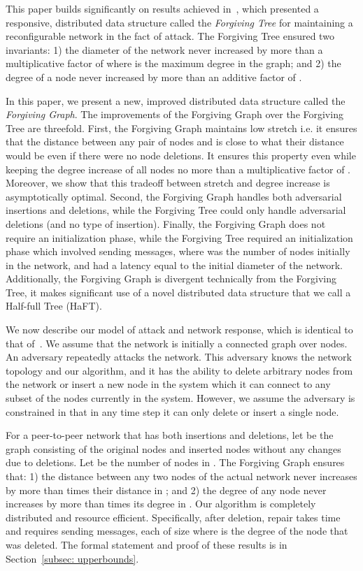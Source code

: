 \documentclass[11pt, letter]{article}
\begin{document}
This paper builds significantly on results achieved in~\cite{HayesPODC08}, which presented a responsive, distributed data structure called the \emph{Forgiving Tree} for maintaining a reconfigurable network in the fact of attack. The Forgiving Tree ensured two invariants: 1) the diameter of the network never increased by more than a multiplicative factor of  where  is the maximum degree in the graph; and 2) the degree of a node never increased by more than an additive factor of .  

In this paper, we present a new, improved distributed data structure called the \emph{Forgiving Graph}.  The improvements of the Forgiving Graph over the Forgiving Tree are threefold.  First, the Forgiving Graph maintains 
low stretch i.e. it ensures that the distance between any pair of nodes  and  is close to what their distance would be even if there were no node deletions.  It ensures this property even while keeping the degree increase of all nodes no more than a multiplicative factor of .  Moreover, we show that this tradeoff between stretch and degree increase is asymptotically optimal.  Second, the Forgiving Graph handles both adversarial insertions and deletions, while the Forgiving Tree could only handle adversarial deletions (and no type of insertion).  Finally, the Forgiving Graph does not require an initialization phase, while the Forgiving Tree required an initialization phase which involved sending  messages, where  was the number of nodes initially in the network, and had a latency equal to the initial diameter of the network.  Additionally, the Forgiving Graph is divergent technically from the Forgiving Tree, it makes significant use of a novel distributed data structure that we call a Half-full Tree (HaFT). 

\medskip
{} We now describe our model of attack and
network response, which is identical to that of~\cite{HayesPODC08}.  We assume that the network is initially a connected
graph over  nodes.  An adversary repeatedly attacks the
network. This adversary knows the network topology and our
algorithm, and it has the ability to delete arbitrary nodes from the
 network or insert a new node in the system which it can connect to any subset of the nodes currently in the system.  
However, we assume the adversary is constrained in that in any time step it can only delete or insert a single node. 

\medskip
{}  For a peer-to-peer network that has both insertions and deletions, let  be the graph consisting of the original nodes and inserted nodes without any changes due to deletions. Let  be the number of
nodes in . The Forgiving Graph ensures that: 1) the distance between any two nodes of the actual network never increases by more than  times their distance in ; and 2) the degree of any node never increases by more than  times its degree in .  Our algorithm is completely distributed and resource efficient.  Specifically, after deletion, repair takes
 time and requires sending  messages, each of size  where  is the degree
of the node that was deleted. The formal statement and proof of these results is in Section~\ref{subsec: upperbounds}. 
\end{document}
